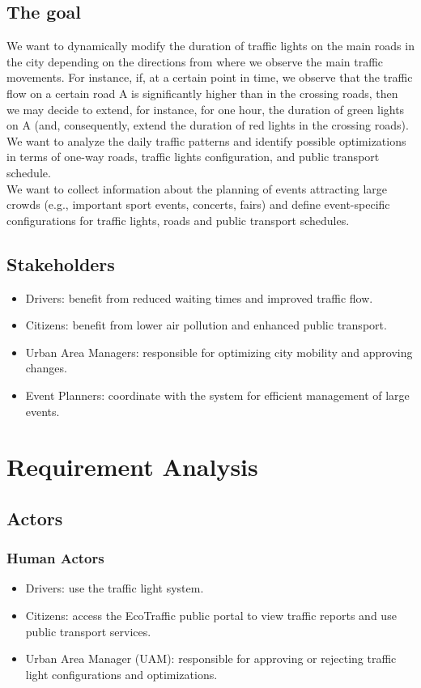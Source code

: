 \documentclass[12pt, a4paper, twoside, openright]{report}
\begin{document}
\section{The goal}

We want to dynamically modify the duration of traffic lights on the main
roads in the city depending on the directions from where we observe the
main traffic movements. For instance, if, at a certain point in time, we
observe that the traffic flow on a certain road A is significantly
higher than in the crossing roads, then we may decide to extend, for
instance, for one hour, the duration of green lights on A (and,
consequently, extend the duration of red lights in the crossing
roads).\\
We want to analyze the daily traffic patterns and identify possible
optimizations in terms of one-way roads, traffic lights configuration,
and public transport schedule.\\
We want to collect information about the planning of events attracting
large crowds (e.g., important sport events, concerts, fairs) and define
event-specific configurations for traffic lights, roads and public
transport schedules.

\section{Stakeholders}
\begin{itemize}
  \item Drivers: benefit from reduced waiting times and improved traffic flow.
  \item Citizens: benefit from lower air pollution and enhanced public transport.
  \item Urban Area Managers: responsible for optimizing city mobility and approving changes.
  \item Event Planners: coordinate with the system for efficient management of large events.
\end{itemize}

\chapter{Requirement Analysis}

\section{Actors}
\subsection{Human Actors}
\begin{itemize}
  \item Drivers: use the traffic light system.
  \item Citizens: access the EcoTraffic public portal to view traffic reports and use public transport services.
  \item Urban Area Manager (UAM): responsible for approving or rejecting traffic light configurations and optimizations.
\end{itemize}
\end{document}
